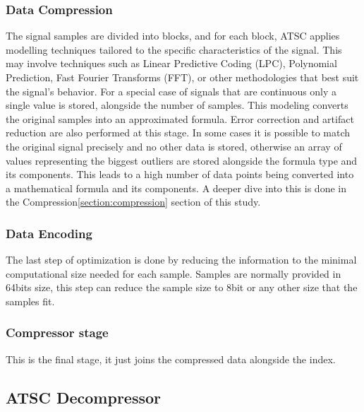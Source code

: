 \documentclass[conference]{IEEEtran}
\begin{document}
\subsubsection{Data Compression}
The signal samples are divided into blocks, and for each block, ATSC applies modelling techniques tailored to the specific characteristics of the signal. 
This may involve techniques such as Linear Predictive Coding (LPC), Polynomial Prediction, Fast Fourier Transforms (FFT), or other methodologies that best suit the signal's behavior. 
For a special case of signals that are continuous only a single value is stored, alongside the number of samples.
This modeling converts the original samples into an approximated formula.
Error correction and artifact reduction are also performed at this stage.
In some cases it is possible to match the original signal precisely and no other data is stored, otherwise an array of values representing the biggest outliers are stored alongside the formula type and its components.
This leads to a high number of data points being converted into a mathematical formula and its components.
A deeper dive into this is done in the Compression\ref{section:compression} section of this study.

\subsubsection{Data Encoding}
The last step of optimization is done by reducing the information to the minimal computational size needed for each sample. 
Samples are normally provided in 64bits size, this step can reduce the sample size to 8bit or any other size that the samples fit.

\subsubsection{Compressor stage}
This is the final stage, it just joins the compressed data alongside the index.

\subsection{ATSC Decompressor}
\end{document}
